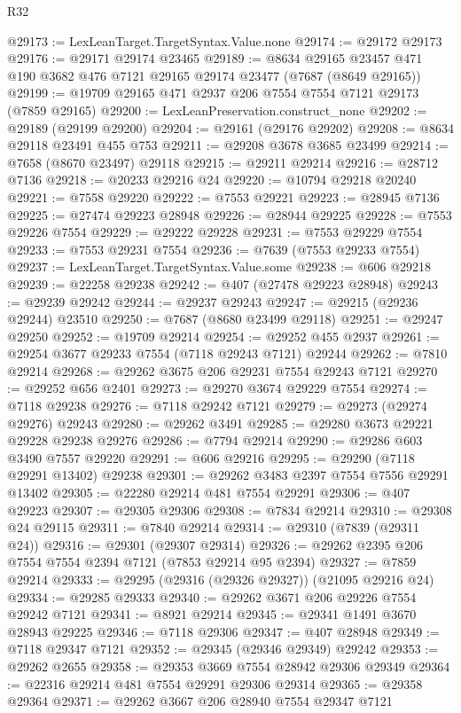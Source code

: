 \begin{lexlean}{R32}
\begin{coremodule}
@29173 := LexLeanTarget.TargetSyntax.Value.none
@29174 := @29172 @29173
@29176 := @29171 @29174 @23465
@29189 := @8634 @29165 @23457 @471 @190 @3682 @476 @7121 @29165 @29174 @23477 (@7687 (@8649 @29165))
@29199 := @19709 @29165 @471 @2937 @206 @7554 @7554 @7121 @29173 (@7859 @29165)
@29200 := LexLeanPreservation.construct_none
@29202 := @29189 (@29199 @29200)
@29204 := @29161 (@29176 @29202)
@29208 := @8634 @29118 @23491 @455 @753
@29211 := @29208 @3678 @3685 @23499
@29214 := @7658 (@8670 @23497) @29118
@29215 := @29211 @29214
@29216 := @28712 @7136
@29218 := @20233 @29216 @24
@29220 := @10794 @29218 @20240
@29221 := @7558 @29220
@29222 := @7553 @29221
@29223 := @28945 @7136
@29225 := @27474 @29223 @28948
@29226 := @28944 @29225
@29228 := @7553 @29226 @7554
@29229 := @29222 @29228
@29231 := @7553 @29229 @7554
@29233 := @7553 @29231 @7554
@29236 := @7639 (@7553 @29233 @7554)
@29237 := LexLeanTarget.TargetSyntax.Value.some
@29238 := @606 @29218
@29239 := @22258 @29238
@29242 := @407 (@27478 @29223 @28948)
@29243 := @29239 @29242
@29244 := @29237 @29243
@29247 := @29215 (@29236 @29244) @23510
@29250 := @7687 (@8680 @23499 @29118)
@29251 := @29247 @29250
@29252 := @19709 @29214
@29254 := @29252 @455 @2937
@29261 := @29254 @3677 @29233 @7554 (@7118 @29243 @7121) @29244
@29262 := @7810 @29214
@29268 := @29262 @3675 @206 @29231 @7554 @29243 @7121
@29270 := @29252 @656 @2401
@29273 := @29270 @3674 @29229 @7554
@29274 := @7118 @29238
@29276 := @7118 @29242 @7121
@29279 := @29273 (@29274 @29276) @29243
@29280 := @29262 @3491
@29285 := @29280 @3673 @29221 @29228 @29238 @29276
@29286 := @7794 @29214
@29290 := @29286 @603 @3490 @7557 @29220
@29291 := @606 @29216
@29295 := @29290 (@7118 @29291 @13402) @29238
@29301 := @29262 @3483 @2397 @7554 @7556 @29291 @13402
@29305 := @22280 @29214 @481 @7554 @29291
@29306 := @407 @29223
@29307 := @29305 @29306
@29308 := @7834 @29214
@29310 := @29308 @24 @29115
@29311 := @7840 @29214
@29314 := @29310 (@7839 (@29311 @24))
@29316 := @29301 (@29307 @29314)
@29326 := @29262 @2395 @206 @7554 @7554 @2394 @7121 (@7853 @29214 @95 @2394)
@29327 := @7859 @29214
@29333 := @29295 (@29316 (@29326 @29327)) (@21095 @29216 @24)
@29334 := @29285 @29333
@29340 := @29262 @3671 @206 @29226 @7554 @29242 @7121
@29341 := @8921 @29214
@29345 := @29341 @1491 @3670 @28943 @29225
@29346 := @7118 @29306
@29347 := @407 @28948
@29349 := @7118 @29347 @7121
@29352 := @29345 (@29346 @29349) @29242
@29353 := @29262 @2655
@29358 := @29353 @3669 @7554 @28942 @29306 @29349
@29364 := @22316 @29214 @481 @7554 @29291 @29306 @29314
@29365 := @29358 @29364
@29371 := @29262 @3667 @206 @28940 @7554 @29347 @7121

\end{coremodule}
\end{lexlean}
